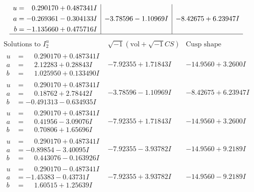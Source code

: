 \documentclass[1p]{elsarticle_modified}
\theoremstyle{definition}
\newcommand{\I}{\sqrt{-1}}
\begin{document}
$$\begin{array}{c|c|c}
\begin{aligned}
u &= \phantom{-}0.290170 + 0.487341 I \\
a &= -0.269361 - 0.304133 I \\
b &= -1.135660 + 0.475716 I\end{aligned}
 & -3.78596 - 1.10969 I & -8.42675 + 6.23947 I\\
 \hline 
 \end{array}$$\newpage$$\begin{array}{c|c|c}  
\text{Solutions to }I^u_{2}& \I (\text{vol} + \sqrt{-1}CS) & \text{Cusp shape}\\
 \hline 
\begin{aligned}
u &= \phantom{-}0.290170 + 0.487341 I \\
a &= \phantom{-}2.12283 + 0.28843 I \\
b &= \phantom{-}1.025950 + 0.133490 I\end{aligned}
 & -7.92355 + 1.71843 I & -14.9560 + 3.2600 I \\ \hline\begin{aligned}
u &= \phantom{-}0.290170 + 0.487341 I \\
a &= \phantom{-}0.18762 + 2.78442 I \\
b &= -0.491313 - 0.634935 I\end{aligned}
 & -3.78596 - 1.10969 I & -8.42675 + 6.23947 I \\ \hline\begin{aligned}
u &= \phantom{-}0.290170 + 0.487341 I \\
a &= \phantom{-}0.41956 - 3.09076 I \\
b &= \phantom{-}0.70806 + 1.65696 I\end{aligned}
 & -7.92355 + 1.71843 I & -14.9560 + 3.2600 I \\ \hline\begin{aligned}
u &= \phantom{-}0.290170 + 0.487341 I \\
a &= -0.89854 - 3.40095 I \\
b &= \phantom{-}0.443076 - 0.163926 I\end{aligned}
 & -7.92355 - 3.93782 I & -14.9560 + 9.2189 I \\ \hline\begin{aligned}
u &= \phantom{-}0.290170 - 0.487341 I \\
a &= -1.45383 - 0.43731 I \\
b &= \phantom{-}1.60515 + 1.25639 I\end{aligned}
 & -7.92355 + 3.93782 I & -14.9560 - 9.2189 I \\ \hline\begin{aligned}

\end{aligned}
\end{array}$$
\end{document}
